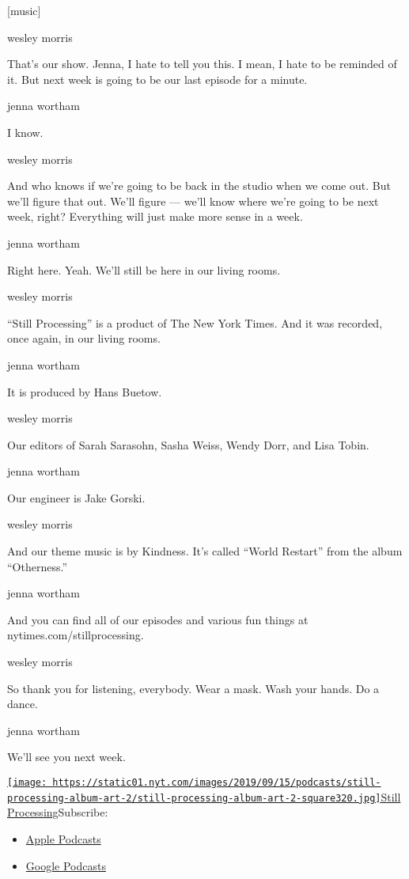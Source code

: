{[}music{]}

wesley morris

That's our show. Jenna, I hate to tell you this. I mean, I hate to be
reminded of it. But next week is going to be our last episode for a
minute.

jenna wortham

I know.

wesley morris

And who knows if we're going to be back in the studio when we come out.
But we'll figure that out. We'll figure --- we'll know where we're going
to be next week, right? Everything will just make more sense in a week.

jenna wortham

Right here. Yeah. We'll still be here in our living rooms.

wesley morris

``Still Processing'' is a product of The New York Times. And it was
recorded, once again, in our living rooms.

jenna wortham

It is produced by Hans Buetow.

wesley morris

Our editors of Sarah Sarasohn, Sasha Weiss, Wendy Dorr, and Lisa Tobin.

jenna wortham

Our engineer is Jake Gorski.

wesley morris

And our theme music is by Kindness. It's called ``World Restart'' from
the album ``Otherness.''

jenna wortham

And you can find all of our episodes and various fun things at
nytimes.com/stillprocessing.

wesley morris

So thank you for listening, everybody. Wear a mask. Wash your hands. Do
a dance.

jenna wortham

We'll see you next week.

\href{https://www.nytimes.com/column/still-processing-podcast}{\texttt{[image: https://static01.nyt.com/images/2019/09/15/podcasts/still-processing-album-art-2/still-processing-album-art-2-square320.jpg]}Still
Processing}Subscribe:

\begin{itemize}
\tightlist
\item
  \href{https://itunes.apple.com/us/podcast/id1151436460}{Apple
  Podcasts}
\item
  \href{https://www.google.com/podcasts?feed=aHR0cHM6Ly9yc3MuYXJ0MTkuY29tL255dC1zdGlsbC1wcm9jZXNzaW5n}{Google
  Podcasts}
\end{itemize}

